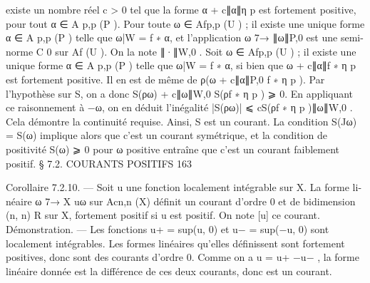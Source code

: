 \documentclass[
  10pt,
]{article}
\newenvironment{Shaded}{}{}
\newcommand{\NormalTok}[1]{#1}
\begin{document}
\begin{Shaded}
\begin{Highlighting}[]
\NormalTok{existe un nombre réel c \textgreater{} 0 tel que la forme α + c∥α∥η p est fortement positive, pour}
\NormalTok{tout α ∈ A p,p (P ).}
\NormalTok{   Pour toute ω ∈ Afp,p (U ) ; il existe une unique forme α ∈ A p,p (P ) telle que ω|W = f ∗ α,}
\NormalTok{et l’application ω 7→ ∥ω∥P,0 est une semi{-}norme C 0 sur Af (U ). On la note ∥·∥W,0 .}
\NormalTok{   Soit ω ∈ Afp,p (U ) ; il existe une unique forme α ∈ A p,p (P ) telle que ω|W = f ∗ α, si}
\NormalTok{bien que ω + c∥α∥f ∗ η p est fortement positive. Il en est de même de ρ(ω + c∥α∥P,0 f ∗ η p ).}
\NormalTok{Par l’hypothèse sur S, on a donc}
\NormalTok{                              S(ρω) + c∥ω∥W,0 S(ρf ∗ η p ) ⩾ 0.}
\NormalTok{En appliquant ce raisonnement à −ω, on en déduit l’inégalité}
\NormalTok{                                |S(ρω)| ⩽ cS(ρf ∗ η p )∥ω∥W,0 .}
\NormalTok{Cela démontre la continuité requise.}
\NormalTok{  Ainsi, S est un courant. La condition S(Jω) = S(ω) implique alors que c’est un courant}
\NormalTok{symétrique, et la condition de positivité S(ω) ⩾ 0 pour ω positive entraîne que c’est un}
\NormalTok{courant faiblement positif.}
\NormalTok{                                 § 7.2. COURANTS POSITIFS                                 163}

\NormalTok{Corollaire 7.2.10.  — Soit u une fonction localement intégrable sur X. La forme li{-}}
\NormalTok{néaire ω 7→ X uω sur Acn,n (X) définit un courant d’ordre 0 et de bidimension (n, n)}
\NormalTok{            R}
\NormalTok{sur X, fortement positif si u est positif.}
\NormalTok{   On note [u] ce courant.}
\NormalTok{Démonstration. — Les fonctions u+ = sup(u, 0) et u− = sup(−u, 0) sont localement}
\NormalTok{intégrables. Les formes linéaires qu’elles définissent sont fortement positives, donc sont}
\NormalTok{des courants d’ordre 0. Comme on a u = u+ −u− , la forme linéaire donnée est la différence}
\NormalTok{de ces deux courants, donc est un courant.}


\end{Highlighting}
\end{Shaded}
\end{document}
